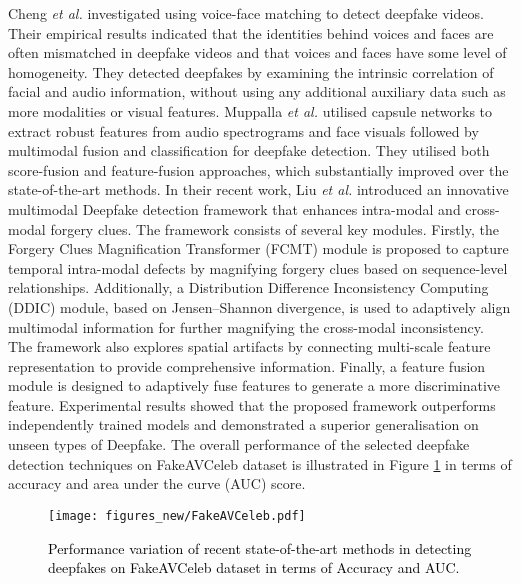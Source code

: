 Cheng \textit{et al.} \cite{cheng2023voice} investigated using voice-face matching to detect deepfake videos. Their empirical results indicated that the identities behind voices and faces are often mismatched in deepfake videos and that voices and faces have some level of homogeneity. They detected deepfakes by examining the intrinsic correlation of facial and audio information, without using any additional auxiliary data such as more modalities or visual features. Muppalla \textit{et al.} \cite{muppalla2023integrating} utilised capsule networks to extract robust features from audio spectrograms and face visuals followed by multimodal fusion and classification for deepfake detection. They utilised both score-fusion and feature-fusion approaches, which substantially improved over the state-of-the-art methods. In their recent work, Liu \textit{et al.} \cite{liu2023magnifying} introduced an innovative multimodal Deepfake detection framework that enhances intra-modal and cross-modal forgery clues. The framework consists of several key modules. Firstly, the Forgery Clues Magnification Transformer (FCMT) module is proposed to capture temporal intra-modal defects by magnifying forgery clues based on sequence-level relationships. Additionally, a Distribution Difference Inconsistency Computing (DDIC) module, based on Jensen–Shannon divergence, is used to adaptively align multimodal information for further magnifying the cross-modal inconsistency. The framework also explores spatial artifacts by connecting multi-scale feature representation to provide comprehensive information. Finally, a feature fusion module is designed to adaptively fuse features to generate a more discriminative feature. Experimental results showed that the proposed framework outperforms independently trained models and demonstrated a superior generalisation on unseen types of Deepfake. The overall performance of the selected deepfake detection techniques on FakeAVCeleb dataset \cite{khalid2021fakeavceleb} is illustrated in Figure \ref{fig:multimodal_summary} in terms of accuracy and area under the curve (AUC) score.

\begin{figure}
    \centering
    \texttt{[image: figures\_new/FakeAVCeleb.pdf]}
    \caption{\textcolor{black}{Performance variation of recent state-of-the-art methods in detecting deepfakes on FakeAVCeleb dataset in terms of Accuracy and AUC.}}
    \label{fig:multimodal_summary}
\end{figure}

